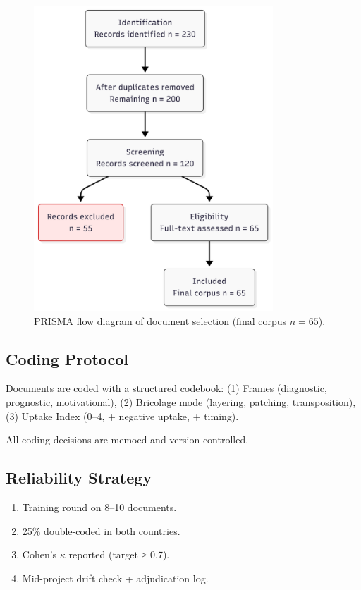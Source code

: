 \begin{figure}[h!]
\centering
\includegraphics[width=0.8\textwidth]{src/fig/prop/06/prisma.png}
\caption{PRISMA flow diagram of document selection (final corpus $n=65$).}
\label{fig:prisma}
\end{figure}


\subsection*{Coding Protocol}
Documents are coded with a structured codebook:  
(1) Frames (diagnostic, prognostic, motivational),  
(2) Bricolage mode (layering, patching, transposition),  
(3) Uptake Index (0–4, + negative uptake, + timing).  

All coding decisions are memoed and version-controlled.

\subsection*{Reliability Strategy}
\begin{enumerate}
    \item Training round on 8–10 documents. 
    \item 25\% double-coded in both countries. 
    \item Cohen’s $\kappa$ reported (target ≥ 0.7). 
    \item Mid-project drift check + adjudication log. 
\end{enumerate}


